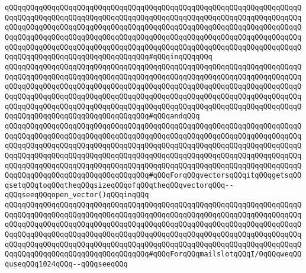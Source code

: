 \verb|qQQqqQQqqQQqqQQqqQQqqQQqqQQqqQQqqQQqqQQqqQQqqQQqqQQqqQQqqQQqqQQqqQQqqQQqqQQqqQQqqQQqqQQqqQQqqQQqqQQqqQQqqQQqqQQqqQQqqQQqqQQqqQQqqQQqqQQqqQQqqQQqqQQqqQQqqQQqqQQqqQQqqQQqqQQqqQQqqQQqqQQqqQQqqQQqqQQqqQQqqQQqqQQqqQQqqQQqqQQqqQQqqQQqqQQqqQQqqQQqqQQqqQQqqQQqqQQqqQQqqQQqqQQqqQQqqQQqqQQqqQQqqQQqqQQqqQQqqQQqqQQqqQQqqQQqqQQqqQQqqQQqqQQqqQQqqQQqqQQqqQQqqQQqqQQqqQQqqQQqqQQqqQQqqQQqqQQqqQQqqQQq#qQQqinqQQqqQQq|\newline
\verb|qQQqqQQqqQQqqQQqqQQqqQQqqQQqqQQqqQQqqQQqqQQqqQQqqQQqqQQqqQQqqQQqqQQqqQQqqQQqqQQqqQQqqQQqqQQqqQQqqQQqqQQqqQQqqQQqqQQqqQQqqQQqqQQqqQQqqQQqqQQqqQQqqQQqqQQqqQQqqQQqqQQqqQQqqQQqqQQqqQQqqQQqqQQqqQQqqQQqqQQqqQQqqQQqqQQqqQQqqQQqqQQqqQQqqQQqqQQqqQQqqQQqqQQqqQQqqQQqqQQqqQQqqQQqqQQqqQQqqQQqqQQqqQQqqQQqqQQqqQQqqQQqqQQqqQQqqQQqqQQqqQQqqQQqqQQqqQQqqQQqqQQqqQQqqQQqqQQqqQQqqQQqqQQqqQQqqQQqqQQqqQQq#qQQqandqQQq|\newline
\verb|qQQqqQQqqQQqqQQqqQQqqQQqqQQqqQQqqQQqqQQqqQQqqQQqqQQqqQQqqQQqqQQqqQQqqQQqqQQqqQQqqQQqqQQqqQQqqQQqqQQqqQQqqQQqqQQqqQQqqQQqqQQqqQQqqQQqqQQqqQQqqQQqqQQqqQQqqQQqqQQqqQQqqQQqqQQqqQQqqQQqqQQqqQQqqQQqqQQqqQQqqQQqqQQqqQQqqQQqqQQqqQQqqQQqqQQqqQQqqQQqqQQqqQQqqQQqqQQqqQQqqQQqqQQqqQQqqQQqqQQqqQQqqQQqqQQqqQQqqQQqqQQqqQQqqQQqqQQqqQQqqQQqqQQqqQQqqQQqqQQqqQQqqQQqqQQqqQQqqQQqqQQqqQQqqQQqqQQqqQQqqQQq#qQQqForqQQqvectorsqQQqitqQQqgetsqQQqsetqQQqtoqQQqtheqQQqsizeqQQqofqQQqtheqQQqvectorqQQq--qQQqseeqQQqopen_vector()qQQqinqQQq|\newline
\verb|qQQqqQQqqQQqqQQqqQQqqQQqqQQqqQQqqQQqqQQqqQQqqQQqqQQqqQQqqQQqqQQqqQQqqQQqqQQqqQQqqQQqqQQqqQQqqQQqqQQqqQQqqQQqqQQqqQQqqQQqqQQqqQQqqQQqqQQqqQQqqQQqqQQqqQQqqQQqqQQqqQQqqQQqqQQqqQQqqQQqqQQqqQQqqQQqqQQqqQQqqQQqqQQqqQQqqQQqqQQqqQQqqQQqqQQqqQQqqQQqqQQqqQQqqQQqqQQqqQQqqQQqqQQqqQQqqQQqqQQqqQQqqQQqqQQqqQQqqQQqqQQqqQQqqQQqqQQqqQQqqQQqqQQqqQQqqQQqqQQqqQQqqQQqqQQqqQQqqQQqqQQqqQQqqQQqqQQqqQQqqQQq#qQQqForqQQqmailslotqQQqI/OqQQqweqQQquseqQQq1024qQQq--qQQqseeqQQq|\newline
\newline
